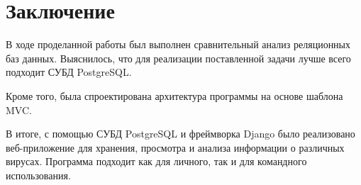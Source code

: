 \documentclass[a4paper,14pt]{extarticle}
\begin{document}
 	\newpage
 	
 	\newpage
 	\section*{Заключение}
 	
 	В ходе проделанной работы был выполнен сравнительный анализ реляционных баз данных.
 	Выяснилось, что для реализации поставленной задачи
 	лучше всего подходит СУБД PostgreSQL.
 	
 	Кроме того, была спроектирована архитектура программы на основе шаблона MVC.
 	
 	В итоге, с помощью СУБД PostgreSQL и фреймворка Django было реализовано
 	веб-приложение для хранения, просмотра и анализа информации о различных вирусах. Программа подходит как для личного, так и для командного использования.
 	
\end{document}
